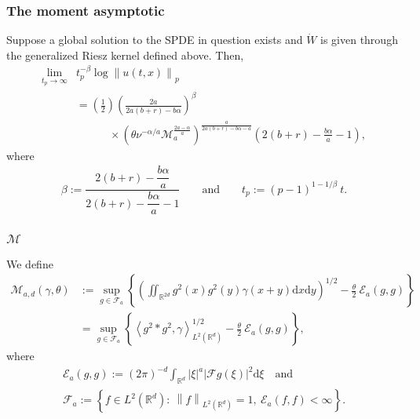 \documentclass{beamer}%
\numberwithin{equation}{section}
\newcommand{\R}{\mathbb{R}}
\newcommand{\Norm}[1]{\left\|  #1   \right\|}
\newcommand{\ud}{\ensuremath{\mathrm{d} }}
\begin{document}
		\begin{frame}[t]
		\frametitle{The moment asymptotic}
		\begin{theorem}
			Suppose a global solution to the SPDE in question exists and $\dot{W}$ is given through the generalized Riesz kernel defined above. Then,
			\begin{align*}
			\lim_{t_p \to \infty} &  t_p^{-\beta} \log \Norm{u(t,x)}_p
			\\& =  \left(\frac{1}{2}\right)\left(\frac{2a}{2a(b+r)- b\alpha} \right)^\beta \\
			& \quad \quad \quad  \times \left(\theta\nu^{-\alpha/a} \mathcal{M}_a^{\frac{2a-\alpha}{a}}\right)^{\frac{a}{2a(b+r)-b\alpha-a}}\left(2(b+r)-\frac{b\alpha}{a}-1\right),
			\end{align*}
			where
			\begin{align}
			\label{E:beta-tp}
			\beta := \dfrac{2(b+r)-\dfrac{b\alpha}{a}}{ 2(b+r)-\dfrac{b\alpha}{a} -1 } \qquad \text{and} \qquad
			t_p   := (p-1)^{1-1/\beta} \: t.
			\end{align}
		\end{theorem}

	\end{frame}

	\begin{frame}[t]
		\frametitle{$\mathcal{M}$}
		We define
		\begin{align*}
		\mathcal{M}_{a,d}(\gamma,\theta) & := \sup_{g \in \mathcal{F}_a} \left\{ \left( \iint_{\R^{2d}} g^2(x)g^2(y) \gamma(x+y)\ud x\ud y \right)^{1/2} - \frac{\theta}{2}\: \mathcal{E}_a(g,g) \right\} \\
		& = \sup_{g \in \mathcal{F}_a} \left\{ \left\langle g^2 * g^2, \gamma \right\rangle_{L^2(\R^d)}^{1/2} - \frac{\theta}{2}\: \mathcal{E}_a(g,g) \right\},
		\end{align*}
		where
		\begin{gather}
		\mathcal{E}_a(g,g) := (2\pi)^{-d} \int_{\R^d} |\xi|^a |\mathcal{F}g(\xi)|^2 \ud \xi \quad \text{and} \\
		\mathcal{F}_a      := \left\{f\in L^2(\R^d): \: \Norm{f}_{L^2(\R^d)}=1,\: \mathcal{E}_a(f,f)<\infty \right\}.
		\end{gather}
	\end{frame}
\end{document}
